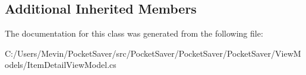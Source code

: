 \subsection*{Additional Inherited Members}


The documentation for this class was generated from the following file\+:\begin{DoxyCompactItemize}
\item 
C\+:/\+Users/\+Mevin/\+Pocket\+Saver/src/\+Pocket\+Saver/\+Pocket\+Saver/\+Pocket\+Saver/\+View\+Models/Item\+Detail\+View\+Model.\+cs\end{DoxyCompactItemize}
